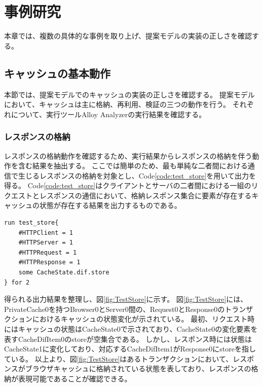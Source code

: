\documentclass[12pt,a4paper]{jbook}
\begin{document}
\newpage

\color{red}
\chapter{事例研究}
本章では、複数の具体的な事例を取り上げ、提案モデルの実装の正しさを確認する。

\section{キャッシュの基本動作}
本節では、提案モデルでのキャッシュの実装の正しさを確認する。
提案モデルにおいて、キャッシュは主に格納、再利用、検証の三つの動作を行う。
それぞれについて、実行ツールAlloy Analyzerの実行結果を確認する。

\subsection{レスポンスの格納}
レスポンスの格納動作を確認するため、実行結果からレスポンスの格納を伴う動作を含む結果を抽出する。
ここでは簡単のため、最も単純な二者間における通信で生じるレスポンスの格納を対象とし、Code\ref{code:test_store}を用いて出力を得る。
Code\ref{code:test_store}はクライアントとサーバの二者間における一組のリクエストとレスポンスの通信において、格納レスポンス集合に要素が存在するキャッシュの状態が存在する結果を出力するものである。

\begin{lstlisting}[caption=レスポンスの格納, label=code:test_store]
run test_store{
	#HTTPClient = 1
	#HTTPServer = 1
	#HTTPRequest = 1
	#HTTPResponse = 1
	some CacheState.dif.store
} for 2
\end{lstlisting}

得られる出力結果を整理し、図\ref{fig:TestStore}に示す。
図\ref{fig:TestStore}には、PrivateCache0を持つBrowser0とServer0間の、Request0とResponse0のトランザクションにおけるキャッシュの状態変化が示されている。
最初、リクエスト時にはキャッシュの状態はCacheState0で示されており、CacheState0の変化要素を表すCacheDifItem0のstoreが空集合である。
しかし、レスポンス時には状態はCacheState1に変化しており、対応するCacheDifItem1がResponse0にstoreを指している。
以上より、図\ref{fig:TestStore}はあるトランザクションにおいて、レスポンスがブラウザキャッシュに格納されている状態を表しており、レスポンスの格納が表現可能であることが確認できる。
\end{document}

